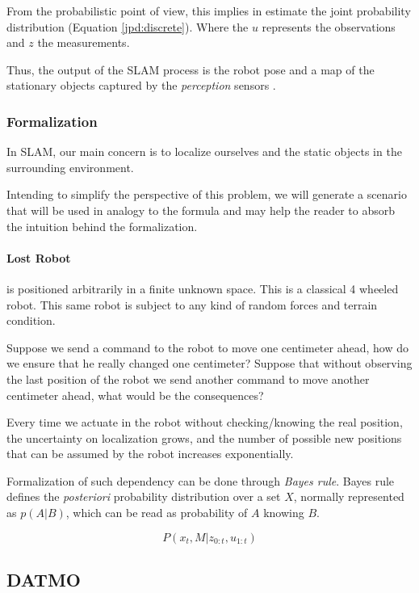 From the probabilistic point of view, this implies in estimate the joint probability distribution (Equation \ref{jpd:discrete}). Where the $u$ represents the observations and $z$ the measurements.

Thus, the output of the SLAM process is the robot pose and a map of the stationary objects captured by the \textit{perception} sensors \cite{iyengar1991autonomous}.

\subsubsection{Formalization}

In SLAM, our main concern is to localize ourselves and the static objects in the surrounding environment. 

Intending to simplify the perspective of this problem, we will generate a scenario that will be used in analogy to the formula and may help the reader to absorb the intuition behind the formalization.

\paragraph*{Lost Robot} is positioned arbitrarily in a finite unknown space. This is a classical 4 wheeled robot. This same robot is subject to any kind of random forces and terrain condition. 

Suppose we send a command to the robot to move one centimeter ahead, how do we ensure that he really changed one centimeter? Suppose that without observing the last position of the robot we send another command to move another centimeter ahead, what would be the consequences? 

Every time we actuate in the robot without checking/knowing the real position, the uncertainty on localization grows, and the number of possible new positions that can be assumed by the robot increases exponentially.

Formalization of such dependency can be done through \textit{Bayes rule}. Bayes rule defines the \textit{posteriori} probability distribution over a set $X$, normally represented as $p(A | B)$, which can be read as probability of $A$ knowing $B$.

\begin{equation}
\label{jpd:discrete}
P(x_t,M | z_{0:t}, u_{1:t})
\end{equation}

\subsection{DATMO}

